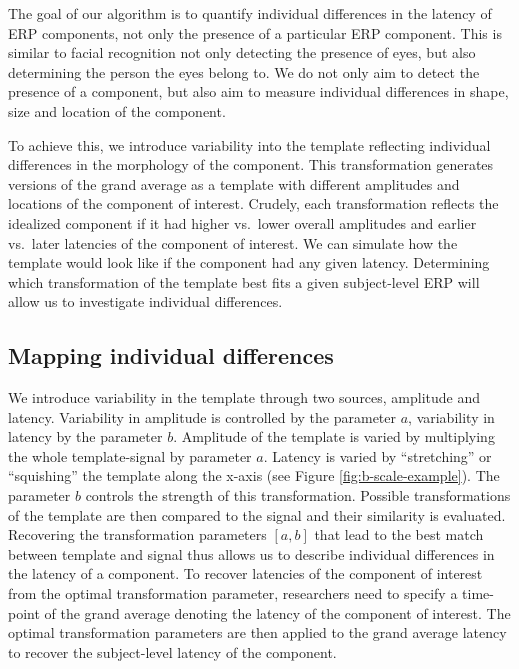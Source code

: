 \documentclass[
  man]{apa7}
\begin{document}
The goal of our algorithm is to quantify individual differences in the latency of ERP components, not only the presence of a particular ERP component. This is similar to facial recognition not only detecting the presence of eyes, but also determining the person the eyes belong to. We do not only aim to detect the presence of a component, but also aim to measure individual differences in shape, size and location of the component.

To achieve this, we introduce variability into the template reflecting individual differences in the morphology of the component. This transformation generates versions of the grand average as a template with different amplitudes and locations of the component of interest. Crudely, each transformation reflects the idealized component if it had higher vs.~lower overall amplitudes and earlier vs.~later latencies of the component of interest. We can simulate how the template would look like if the component had any given latency. Determining which transformation of the template best fits a given subject-level ERP will allow us to investigate individual differences.

\hypertarget{mapping-individual-differences}{%
\subsection{Mapping individual differences}\label{mapping-individual-differences}}

We introduce variability in the template through two sources, amplitude and latency. Variability in amplitude is controlled by the parameter \(a\), variability in latency by the parameter \(b\). Amplitude of the template is varied by multiplying the whole template-signal by parameter \(a\). Latency is varied by ``stretching'' or ``squishing'' the template along the x-axis (see Figure \ref{fig:b-scale-example}). The parameter \(b\) controls the strength of this transformation. Possible transformations of the template are then compared to the signal and their similarity is evaluated. Recovering the transformation parameters \([a, b]\) that lead to the best match between template and signal thus allows us to describe individual differences in the latency of a component. To recover latencies of the component of interest from the optimal transformation parameter, researchers need to specify a time-point of the grand average denoting the latency of the component of interest. The optimal transformation parameters are then applied to the grand average latency to recover the subject-level latency of the component.
\end{document}
